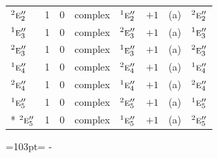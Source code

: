 \documentclass[10pt,a4paper]{article}
\newcommand{\needspace}[1]{\par\penalty-100\begingroup\dimen0=#1\relax\dimen2=\pagegoal
  \advance\dimen2-\pagetotal\ifdim\dimen0>\dimen2\relax\ifdim\dimen2>0pt\vfil\break\fi\fi
  \endgroup}
\numberwithin{equation}{section}
\newcommand{\irr}[1]{\text{\normalfont\scshape #1}}
\newcommand{\conjpair}[1]{{}^{#1}}
\begin{document}
{\begin{longtable}{@{}lrrllrll@{}}
$\conjpair{2}\irr{e}_{2}''$ & 1 & $0$ & complex & $\conjpair{1}\irr{e}_{2}''$ & $+1$ & (a) & $\conjpair{2}\irr{e}_{2}''$\\
$\conjpair{1}\irr{e}_{3}''$ & 1 & $0$ & complex & $\conjpair{2}\irr{e}_{3}''$ & $+1$ & (a) & $\conjpair{1}\irr{e}_{3}''$\\
$\conjpair{2}\irr{e}_{3}''$ & 1 & $0$ & complex & $\conjpair{1}\irr{e}_{3}''$ & $+1$ & (a) & $\conjpair{2}\irr{e}_{3}''$\\
$\conjpair{1}\irr{e}_{4}''$ & 1 & $0$ & complex & $\conjpair{2}\irr{e}_{4}''$ & $+1$ & (a) & $\conjpair{1}\irr{e}_{4}''$\\
$\conjpair{2}\irr{e}_{4}''$ & 1 & $0$ & complex & $\conjpair{1}\irr{e}_{4}''$ & $+1$ & (a) & $\conjpair{2}\irr{e}_{4}''$\\
$\conjpair{1}\irr{e}_{5}''$ & 1 & $0$ & complex & $\conjpair{2}\irr{e}_{5}''$ & $+1$ & (a) & $\conjpair{1}\irr{e}_{5}''$\\*
$\conjpair{2}\irr{e}_{5}''$ & 1 & $0$ & complex & $\conjpair{1}\irr{e}_{5}''$ & $+1$ & (a) & $\conjpair{2}\irr{e}_{5}''$\\
\bottomrule\end{longtable}}
\needspace{103pt}
\end{document}
